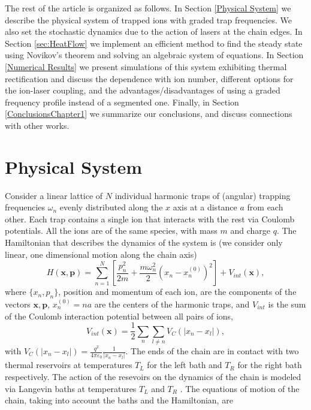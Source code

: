 The rest of the article is organized as follows. In Section \ref{Physical System} we describe the physical system of trapped ions with graded trap frequencies. We also set the stochastic dynamics due to the action of lasers at the chain edges.
In Section \ref{sec:HeatFlow}  we implement an efficient  method to find the steady state using Novikov's theorem and solving an algebraic system of equations. In Section \ref{Numerical Results} we present simulations of this system exhibiting thermal rectification and discuss the dependence with ion number, different options for the ion-laser coupling, and the advantages/disadvantages of using a graded frequency profile instead of a segmented one. Finally, in Section \ref{ConclusionsChapter1} we summarize our conclusions, and discuss connections with other works.
%
%
%
\section{Physical System\label{Physical System}}
%
%
%
%
Consider a linear lattice of $N$ individual harmonic traps of (angular) trapping frequencies  $\omega_n$ evenly distributed along the $x$ axis at a distance $a$ from each other. Each trap contains a single ion that interacts with the rest via Coulomb potentials. All the ions are of the same species, with mass $m$ and charge $q$. The Hamiltonian that describes the dynamics of the system is (we consider only linear, one dimensional motion along the chain axis)
%
\begin{equation}
    H(\bm{x},\bm{p}) = \sum_{n=1}^N \left[\frac{p_n^2}{2m}  + \frac{m\omega_n^2}{2} (x_n - x_n^{(0)})^2\right] + V_{int}(\bm{x}),
    \label{eq:ChainHamiltonian}
\end{equation}
%
where $\{x_n,p_n\}$, position and momentum of each ion, are the components of  the vectors
$\bm{x},\bm{p}$, $x_n^{(0)} = n  a$ are the centers of the harmonic traps, and $V_{int}$ is the sum of the Coulomb interaction potential between all  pairs of ions,
%
\begin{equation}
    V_{int}(\bm{x}) = \frac{1}{2}\sum_n \sum_{l\neq n} V_{C}(\left|x_n-x_l\right|),
    \label{eq:InteractionHamiltonian}
\end{equation}
%
with $V_{C}(\left|x_n-x_l\right|) = \frac{q^2}{4\pi\varepsilon_0}\frac{1}{\left|x_n-x_l\right|}$. The ends of the chain are in contact with two thermal reservoirs at temperatures $T_L$ for the left bath and $T_R$ for the right bath respectively. The action of the resevoirs on the dynamics of the chain is modeled via Langevin baths at temperatures $T_L$ and $T_R$ \cite{Lepri2003,Dhar2018}. The equations of motion of the chain, taking into account the baths and the Hamiltonian, are
